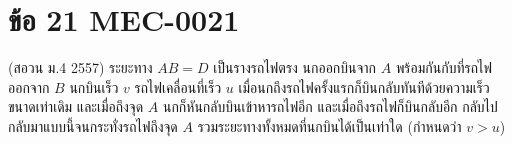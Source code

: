 \section*{ข้อ 21 \hfill \normalsize MEC-0021}
(สอวน ม.4 2557) ระยะทาง $AB=D$ เป็นรางรถไฟตรง นกออกบินจาก $A$ พร้อมกันกับที่รถไฟออกจาก $B$ นกบินเร็ว $v$ รถไฟเคลื่อนที่เร็ว $u$ เมื่อนกถึงรถไฟครั้งแรกก็บินกลับทันทีด้วยความเร็วขนาดเท่าเดิม และเมื่อถึงจุด $A$ นกก็หันกลับบินเข้าหารถไฟอีก และเมื่อถึงรถไฟก็บินกลับอีก กลับไปกลับมาแบบนี้จนกระทั่งรถไฟถึงจุด $A$ รวมระยะทางทั้งหมดที่นกบินได้เป็นเท่าใด (กำหนดว่า $v>u$)
\begin{center}\end{center}
\medskip
